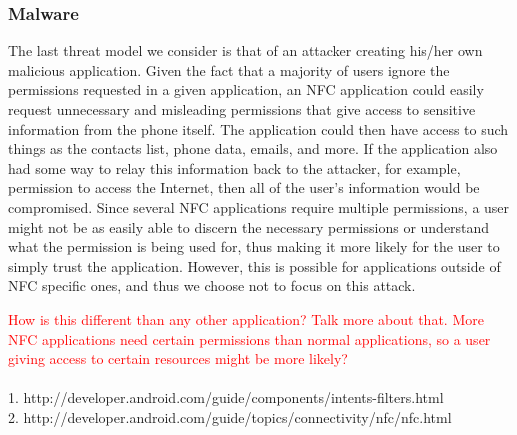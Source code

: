 \documentclass[12pt]{article}
\newcommand\TODO[1]{\textcolor{red}{#1}}
\begin{document}
\subsubsection{Malware}
The last threat model we consider is that of an attacker creating his/her own malicious application. Given the fact that a majority of users ignore the permissions requested in a given application, an NFC application could easily request unnecessary and misleading permissions that give access to sensitive information from the phone itself. The application could then have access to such things as the contacts list, phone data, emails, and more. If the application also had some way to relay this information back to the attacker, for example, permission to access the Internet, then all of the user's information would be compromised. Since several NFC applications require multiple permissions, a user might not be as easily able to discern the necessary permissions or understand what the permission is being used for, thus making it more likely for the user to simply trust the application. However, this is possible for applications outside of NFC specific ones, and thus we choose not to focus on this attack. 

\TODO{How is this different than any other application? Talk more about that. More NFC applications need certain permissions than normal applications, so a user giving access to certain resources might be more likely?}
\\
\\
1. http://developer.android.com/guide/components/intents-filters.html
\\
2. http://developer.android.com/guide/topics/connectivity/nfc/nfc.html
\end{document}
